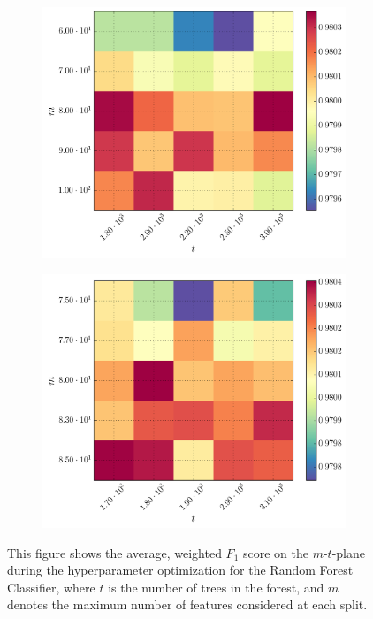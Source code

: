 \begin{figure}[h]
\ContinuedFloat
	\centering
	\begin{subfigure}[t]{0.49\textwidth}
		\centering
		\includegraphics[width=\textwidth]{figures/gridsearch/rf/superclasses/rf-superclasses-03.png}
	\end{subfigure}
	\begin{subfigure}[t]{0.49\textwidth}
		\centering
		\includegraphics[width=\textwidth]{figures/gridsearch/rf/superclasses/rf-superclasses-04.png}
	\end{subfigure}
	\caption[Hyperparameter optimization for the Random Forest Classifier]{This figure shows the average, weighted $F_1$ score on the $m$-$t$-plane during the hyperparameter optimization for the Random Forest Classifier, where $t$ is the number of trees in the forest, and $m$ denotes the maximum number of features considered at each split.}
	\label{fig:gridsearch-rf-superclasses}
\end{figure}

